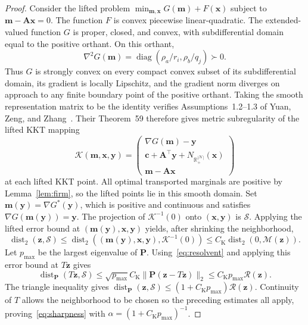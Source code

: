 \documentclass[11pt]{article}
\theoremstyle{remark}
\newcommand{\R}{\mathbb R}
\newcommand{\dist}{\operatorname{dist}}
\newcommand{\dd}[1]{\operatorname{dist}_{\mathbf P}(#1,\mathcal S)}
\newcommand{\res}{\mathcal R}
\begin{document}
\begin{proof}
Consider the lifted problem $\min_{\mathbf m,\mathbf x}G(\mathbf m)+F(\mathbf x)$ subject to $\mathbf m-\mathbf A\mathbf x=0$.
The function $F$ is convex piecewise linear-quadratic.
The extended-valued function $G$ is proper, closed, and convex, with subdifferential domain equal to the positive orthant.
On this orthant,
\begin{equation}
\nabla^2G(\mathbf m)=\operatorname{diag}(\rho_a/r_i,\rho_b/q_j)\succ0.
\end{equation}
Thus $G$ is strongly convex on every compact convex subset of its subdifferential domain, its gradient is locally Lipschitz, and the gradient norm diverges on approach to any finite boundary point of the positive orthant.
Taking the smooth representation matrix to be the identity verifies Assumptions~1.2--1.3 of Yuan, Zeng, and Zhang~\cite{yuan2020}.
Their Theorem~59 therefore gives metric subregularity of the lifted KKT mapping
\begin{equation}
\mathcal K(\mathbf m,\mathbf x,\mathbf y)=\begin{pmatrix}\nabla G(\mathbf m)-\mathbf y\\ \mathbf c+\mathbf A^\top\mathbf y+N_{\R_+^{|\mathcal N|}}(\mathbf x)\\ \mathbf m-\mathbf A\mathbf x\end{pmatrix}
\end{equation}
at each lifted KKT point.
All optimal transported marginals are positive by Lemma~\ref{lem:firm}, so the lifted points lie in this smooth domain.
Set $\mathbf m(\mathbf y)=\nabla G^*(\mathbf y)$, which is positive and continuous and satisfies $\nabla G(\mathbf m(\mathbf y))=\mathbf y$.
The projection of $\mathcal K^{-1}(0)$ onto $(\mathbf x,\mathbf y)$ is $\mathcal S$.
Applying the lifted error bound at $(\mathbf m(\mathbf y),\mathbf x,\mathbf y)$ yields, after shrinking the neighborhood,
\begin{equation}
\dist_2(\mathbf z,\mathcal S)\leq\dist_2((\mathbf m(\mathbf y),\mathbf x,\mathbf y),\mathcal K^{-1}(0))\leq C_{\mathrm K}\dist_2(0,\mathcal M(\mathbf z)).
\end{equation}
Let $p_{\max}$ be the largest eigenvalue of $\mathbf P$.
Using~\eqref{eq:resolvent} and applying this error bound at $T\mathbf z$ gives
\begin{equation}
\dd{T\mathbf z}\leq\sqrt{p_{\max}}C_{\mathrm K}\|\mathbf P(\mathbf z-T\mathbf z)\|_2\leq C_{\mathrm K}p_{\max}\res(\mathbf z).
\end{equation}
The triangle inequality gives $\dd{\mathbf z}\leq(1+C_{\mathrm K}p_{\max})\res(\mathbf z)$.
Continuity of $T$ allows the neighborhood to be chosen so the preceding estimates all apply, proving~\eqref{eq:sharpness} with $\alpha=(1+C_{\mathrm K}p_{\max})^{-1}$.
\end{proof}
\end{document}
